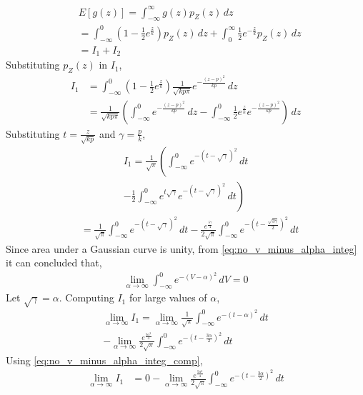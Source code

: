 \documentclass[journal,10pt,twocolumn]{IEEEtran}
\providecommand{\sbrak}[1]{\ensuremath{{}\left[#1\right]}}
\providecommand{\brak}[1]{\ensuremath{\left(#1\right)}}
\begin{document}
\begin{enumerate}
\begin{enumerate}[label=(\alph{enumii})]
\begin{align}
	&E\sbrak{g\brak{z}} = \int_{-\infty}^{\infty} g\brak{z}p_{Z}\brak{z} \,dz\\
	\label{eq:noncoh_bfsk_exp_z_int}
	&=  \int_{-\infty}^{0} \brak{1-\frac{1}{2}e^{\frac{z}{k}}} p_Z\brak{z} \,dz +  \int_{0}^{\infty} \frac{1}{2}e^{-\frac{z}{k}}p_Z\brak{z} \,dz\\
	&= I_1 + I_2
\end{align}
Substituting $p_Z\brak{z}$ in $I_1$,
\begin{align}
	I_1 &= \int_{-\infty}^{0} \brak{1-\frac{1}{2}e^{\frac{z}{k}}} \frac{1}{\sqrt{kp\pi}}e^{-\frac{\brak{z-p}^2}{kp}} \,dz\\
	&= \frac{1}{\sqrt{kp\pi}}\brak{\int_{-\infty}^{0} e^{-\frac{\brak{z-p}^2}{kp}} \,dz - \int_{-\infty}^{0} \frac{1}{2}e^{\frac{z}{k}} e^{-\frac{\brak{z-p}^2}{kp}}} \,dz
\end{align}
Substituting $t = \frac{z}{\sqrt{kp}}$ and $\gamma = \frac{p}{k}$,
\begin{multline}
	I_1 = \frac{1}{\sqrt{\pi}}\left(\int_{-\infty}^{0} e^{-\brak{t-\sqrt{\gamma}}^2} \,dt \right.\\
	\left. - \frac{1}{2} \int_{-\infty}^{0} e^{t \sqrt{\gamma}} e^{-\brak{t-\sqrt{\gamma}}^2} \,dt \right)
\end{multline}
\begin{align}
	&= \frac{1}{\sqrt{\pi}}\int_{-\infty}^{0} e^{-\brak{t-\sqrt{\gamma}}^2} \,dt - \frac{e^{\frac{5\gamma}{4}}}{2\sqrt{\pi}} \int_{-\infty}^{0} e^{-\brak{t-\frac{\sqrt{3\gamma}}{2}}^2} \,dt
\end{align}
Since area under a Gaussian curve is unity, from \eqref{eq:no_v_minus_alpha_integ} it can concluded that,
\begin{align}
	\label{eq:no_v_minus_alpha_integ_comp}
	\lim_{\alpha \rightarrow \infty} \int_{-\infty}^{0} e^{-\brak{V-\alpha}^2} \,dV = 0
\end{align}
Let $\sqrt{\gamma} = \alpha$. Computing $I_1$ for large values of $\alpha$,
\begin{multline}
	\lim_{\alpha \rightarrow \infty} I_1 = \lim_{\alpha \rightarrow \infty} \frac{1}{\sqrt{\pi}} \int_{-\infty}^{0} e^{-\brak{t-\alpha}^2} \,dt\\
	- \lim_{\alpha \rightarrow \infty} \frac{e^{\frac{5\alpha^2}{4}}}{2\sqrt{\pi}} \int_{-\infty}^{0} e^{-\brak{t-\frac{3\alpha}{2}}^2} \,dt
\end{multline}
Using \eqref{eq:no_v_minus_alpha_integ_comp},
\begin{align}
	\lim_{\alpha \rightarrow \infty} I_1 &= 0 - \lim_{\alpha \rightarrow \infty} \frac{e^{\frac{5\alpha^2}{4}}}{2\sqrt{\pi}} \int_{-\infty}^{0} e^{-\brak{t-\frac{3\alpha}{2}}^2} \,dt\\

\end{align}
\end{enumerate}
\end{enumerate}
\end{document}
